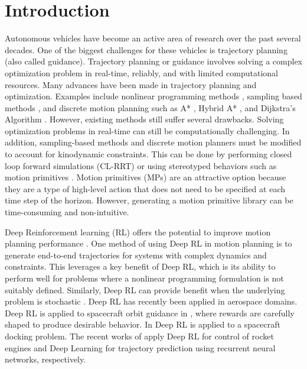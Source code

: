 \documentclass{UnderReview}
\begin{document}
\section{Introduction}
Autonomous vehicles have become an active area of research over the past several decades.  One of the biggest challenges for these vehicles is trajectory planning (also called guidance).  Trajectory planning or guidance involves solving a complex optimization problem in real-time, reliably, and with limited computational resources.  Many advances have been made in trajectory planning and optimization.  Examples include nonlinear programming methods \cite{betts2010practical}, sampling based methods \cite{lavalle2001randomized}, and discrete motion planning such as A* \cite{hart1968formal}, Hybrid A* \cite{dolgov2008practical}, and Dijkstra's Algorithm \cite{dijkstra1959note}. 
%
However, existing methods still suffer several drawbacks.  Solving optimization problems in real-time can still be computationally challenging.  In addition, sampling-based methods and discrete motion planners must be modified to account for kinodynamic constraints.  This can be done by performing closed loop forward simulations (CL-RRT) \cite{kuwata2009real} or using stereotyped behaviors such as motion primitives \cite{frazzoli2000robust}.  Motion primitives (MPs) are an attractive option because they are a type of high-level action that does not need to be specified at each time step of the horizon.  However, generating a motion primitive library can be time-consuming and non-intuitive.

Deep Reinforcement learning (RL) \cite{mnih2015human}  offers the potential to improve motion planning performance \cite{faust2018prm}.  One method of using Deep RL in motion planning is to generate end-to-end trajectories for systems with complex dynamics and constraints.  This leverages a key benefit of Deep RL, which is its ability to perform well for problems where a nonlinear programming formulation is not suitably defined.  Similarly, Deep RL can provide benefit when the underlying problem is stochastic \cite{bellemare2020autonomous}.  Deep RL has recently been applied in aerospace domains.  Deep RL is applied to spacecraft orbit guidance in \cite{lafarge2020guidance}, where rewards are carefully shaped to produce desirable behavior.  In \cite{hovell2020deep} Deep RL is applied to a spacecraft docking problem.  The recent works of \cite{waxenegger2021reinforcement, capobianco2021deep} apply Deep RL for control of rocket engines and Deep Learning for trajectory prediction using recurrent neural networks, respectively.
\end{document}
